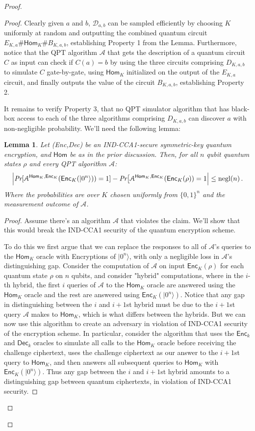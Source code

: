 \documentclass[11pt]{article}
\numberwithin{equation}{section}
\newtheorem{lemma}[theorem]{Lemma}
\newcommand{\opn}{\operatorname}
\newcommand{\algo}{\mathcal}
\newcommand{\negl}{\opn{negl}}
\newcommand{\Enc}{\ensuremath{\mathsf{Enc}}\xspace}
\newcommand{\Dec}{\ensuremath{\mathsf{Dec}}\xspace}
\newcommand{\Homorcl}{\ensuremath{\mathsf{Hom}}\xspace}
\begin{document}
{\begin{proof}
\begin{proof}
Clearly given $a$ and $b$, $\mathcal{D}_{a,b}$ can be sampled efficiently by choosing $K$ uniformly at random and outputting the combined quantum circuit $E_{K,a}\#\Homorcl_{K}\#B_{K,a,b}$, establishing Property 1 from the Lemma.  Furthermore, notice that the QPT algorithm $\algo{A}$ that gets the description of a quantum circuit $C$ as input can check if $C(a)=b$ by using the three circuits comprising $D_{K,a,b}$ to simulate $C$ gate-by-gate, using $\Homorcl_K$ initialized on the output of the $E_{K,a}$ circuit, and finally outputs the value of the circuit $B_{K,a,b}$, establishing Property 2.  

It remains to verify Property 3, that no QPT simulator algorithm that has black-box access to  each of the three algorithms comprising $D_{K,a,b}$ can discover $a$ with non-negligible probability.  We'll need the following lemma:
\begin{lemma}\label{hybrid-lemma}
Let (Enc,Dec) be an IND-CCA1-secure symmetric-key quantum encryption, and $\Homorcl$ be as in the prior discussion.  Then, for all $n$ qubit quantum states $\rho$ and every QPT algorithm $\algo{A}$:
$$
\Bigl| \emph{Pr}[\mathcal A^{\Homorcl_K,\Enc_K}(\Enc_K(|0^n\rangle)) = 1] - \emph{Pr}\bigl[\mathcal A^{\Homorcl_K,\Enc_K}(\Enc_K(\rho)) = 1 \Bigr| \leq \negl(n)\,.
$$
Where the probabilities are over $K$ chosen uniformly from $\{0,1\}^n$ and the measurement outcome of $\algo{A}$.
\end{lemma}
\begin{proof}
Assume there's an algorithm $\algo{A}$ that violates the claim.  We'll show that this would break the IND-CCA1 security of the quantum encryption scheme.

To do this we first argue that we can replace the responses to all of $\algo{A}$'s queries to the $\Homorcl_K$ oracle with Encryptions of $|0^n\rangle$, with only a negligible loss in $\algo{A}$'s distinguishing gap.  Consider the computation of $\algo{A}$ on input $\Enc_K(\rho)$ for each quantum state $\rho$ on $n$ qubits, and consider "hybrid" computations, where in the $i$-th hybrid, the first $i$ queries of $\algo{A}$ to the $\Homorcl_K$ oracle are answered using the $\Homorcl_K$ oracle and the rest are answered using $\Enc_K(|0^n\rangle)$.  Notice that any gap in distinguishing between the $i$ and $i+1$st hybrid must be due to the $i+1$st query $\algo{A}$ makes to $\Homorcl_K$, which is what differs between the hybrids. But we can now use this algorithm to create an adversary in violation of IND-CCA1 security of the encryption scheme.  In particular, consider the algorithm that uses the $\Enc_k$ and $\Dec_k$ oracles to simulate all calls to the $\Homorcl_K$ oracle before receiving the challenge ciphertext, uses the challenge ciphertext as our answer to the $i+1$st query to $\Homorcl_K$, and then answers all subsequent queries to $\Homorcl_K$ with $\Enc_K(|0^n\rangle)$.  Thus any gap between the $i$ and $i+1$st hybrid amounts to a distinguishing gap between quantum ciphertexts, in violation of IND-CCA1 security.


\end{proof}
\end{proof}
\end{proof}}
\end{document}
